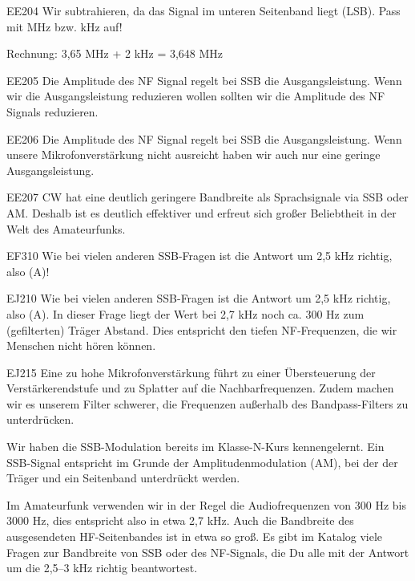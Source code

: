 \begin{sol}{EE204}
  Wir subtrahieren, da das Signal im unteren Seitenband liegt (LSB). Pass mit MHz bzw. kHz auf!
  
  Rechnung: 3,65 MHz + 2 kHz = 3,648 MHz 
\end{sol}


\begin{sol}{EE205}
  Die Amplitude des NF Signal regelt bei SSB die Ausgangsleistung. Wenn wir die Ausgangsleistung reduzieren wollen sollten wir die Amplitude des NF Signals reduzieren.
\end{sol}
\begin{sol}{EE206}
  Die Amplitude des NF Signal regelt bei SSB die Ausgangsleistung. Wenn unsere Mikrofonverstärkung nicht ausreicht haben wir auch nur eine geringe Ausgangsleistung.
\end{sol}
\begin{sol}{EE207}
  CW hat eine deutlich geringere Bandbreite als Sprachsignale via SSB oder AM. Deshalb ist es deutlich effektiver und erfreut sich großer Beliebtheit in der Welt des Amateurfunks.
\end{sol}

\begin{sol}{EF310}
Wie bei vielen anderen SSB-Fragen ist die Antwort um 2,5 kHz richtig, also (A)!
\end{sol}


\begin{sol}{EJ210}
Wie bei vielen anderen SSB-Fragen ist die Antwort um 2,5 kHz richtig, also (A). In dieser Frage liegt der Wert bei 2,7 kHz noch ca. 300 Hz zum (gefilterten) Träger Abstand. Dies entspricht den tiefen NF‑Frequenzen, die wir Menschen nicht hören können.
\end{sol}

\begin{sol}{EJ215}
 Eine zu hohe Mikrofonverstärkung führt zu einer Übersteuerung der Verstärkerendstufe und zu Splatter auf die Nachbarfrequenzen.  Zudem machen wir es unserem Filter schwerer, die Frequenzen außerhalb des Bandpass-Filters zu unterdrücken.
\end{sol}

\begin{ohmchapter}
  Wir haben die SSB-Modulation bereits im Klasse-N-Kurs kennengelernt. Ein SSB-Signal entspricht im Grunde der Amplitudenmodulation (AM), bei der der Träger und ein Seitenband unterdrückt werden.
  
  Im Amateurfunk verwenden wir in der Regel die Audiofrequenzen von 300 Hz bis 3000 Hz, dies entspricht also in etwa 2,7 kHz. Auch die Bandbreite des ausgesendeten HF-Seitenbandes ist in etwa so groß. Es gibt im Katalog viele Fragen zur Bandbreite von SSB oder des NF-Signals, die Du alle mit der Antwort um die 2,5–3 kHz richtig beantwortest.
\end{ohmchapter}  

